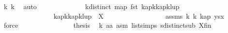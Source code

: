 \begin{isabellebody}
\ k{}\ k{}\ \isamarkupfalse%
\ auto\isanewline
\ \ \ \ \ \ \ \ \ \ \ \ \isamarkupfalse%
\ k{}{}{\isacharcolon}{\kern0pt}{\isachardoublequoteopen}distinct\ {\isacharparenleft}{\kern0pt}map\ fst\ {\isacharbrackleft}{\kern0pt}{\isacharparenleft}{\kern0pt}kap{\isacharbang}{\kern0pt}{\isacharparenleft}{\kern0pt}k{\isacharminus}{\kern0pt}{}{\isacharparenright}{\kern0pt}{\isacharparenright}{\kern0pt}{\isacharcomma}{\kern0pt}{\isacharparenleft}{\kern0pt}kap{\isacharbang}{\kern0pt}{\isacharparenleft}{\kern0pt}k{\isacharminus}{\kern0pt}{}{\isacharparenright}{\kern0pt}{\isacharparenright}{\kern0pt}{\isacharcomma}{\kern0pt}{\isacharparenleft}{\kern0pt}lup{\isacharbang}{\kern0pt}{}{\isacharparenright}{\kern0pt}{\isacharbrackright}{\kern0pt}{\isacharparenright}{\kern0pt}{\isachardoublequoteclose}\isanewline
\ \ \ \ \ \ \ \ \ \ \ \ \isamarkupfalse%
{\isacharminus}{\kern0pt}\isanewline
\ \ \ \ \ \ \ \ \ \ \ \ \ \ \isamarkupfalse%
\ {\isachardoublequoteopen}{\isacharbraceleft}{\kern0pt}{\isacharparenleft}{\kern0pt}kap{\isacharbang}{\kern0pt}{\isacharparenleft}{\kern0pt}k{\isacharminus}{\kern0pt}{}{\isacharparenright}{\kern0pt}{\isacharparenright}{\kern0pt}{\isacharcomma}{\kern0pt}{\isacharparenleft}{\kern0pt}kap{\isacharbang}{\kern0pt}{\isacharparenleft}{\kern0pt}k{\isacharminus}{\kern0pt}{}{\isacharparenright}{\kern0pt}{\isacharparenright}{\kern0pt}{\isacharcomma}{\kern0pt}{\isacharparenleft}{\kern0pt}lup{\isacharbang}{\kern0pt}{}{\isacharparenright}{\kern0pt}{\isacharbraceright}{\kern0pt}\ {\isasymsubseteq}\ X{\isachardoublequoteclose}\isanewline
\ \ \ \ \ \ \ \ \ \ \ \ \ \ \ \ \isamarkupfalse%
\ assms{\isacharparenleft}{\kern0pt}{}{\isacharparenright}{\kern0pt}\ k{}\ k{}\ kap{\isacharparenleft}{\kern0pt}{}{\isacharparenright}{\kern0pt}\ ysx\ \isamarkupfalse%
\ force\isanewline
\ \ \ \ \ \ \ \ \ \ \ \ \ \ \isamarkupfalse%
\ {\isacharquery}{\kern0pt}thesis\ \isamarkupfalse%
\ k{}{}\ aa{}\ asm{\isacharparenleft}{\kern0pt}{}{\isacharparenright}{\kern0pt}\ list{\isachardot}{\kern0pt}simps{\isacharparenleft}{\kern0pt}{}{}{\isacharparenright}{\kern0pt}\ sdistinct{\isacharunderscore}{\kern0pt}sub\ X{\isacharunderscore}{\kern0pt}fin\isanewline
\ \ \ \ \ \ \ \ \ \ \ \ \ \ \ \ \isamarkupfalse%

\end{isabellebody}

